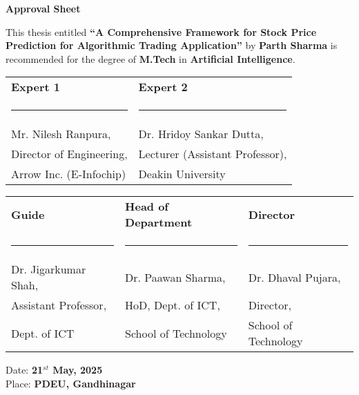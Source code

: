 \begin{center}
\textbf{\large Approval Sheet}
\end{center}

This thesis entitled \textbf{\enquote{A Comprehensive Framework for Stock Price Prediction for Algorithmic Trading Application}} by \textbf{Parth Sharma} is recommended for the degree of \textbf{M.Tech} in \textbf{Artificial Intelligence}.

\vspace{1cm}
\begin{table}[h!]
    \centering
    \begin{tabular}{@{}m{}<{\centering} m{}<{\centering}@{}}
    \textbf{Expert 1} & \textbf{Expert 2} \\[2.5em]
    \rule{0.35\textwidth}{0.4pt} & \rule{0.35\textwidth}{0.4pt} \\[0.5em]
    Mr. Nilesh Ranpura, & Dr. Hridoy Sankar Dutta, \\[0.5em]
    Director of Engineering, & Lecturer (Assistant Professor), \\[0.5em]
    Arrow Inc. (E-Infochip) & Deakin University \\[3em]
    \end{tabular}
\end{table}

\begin{table}[h!]
    \centering
    \begin{tabular}{@{}m{}<{\centering} m{}<{\centering} m{}<{\centering}@{}}
    \textbf{Guide} & \textbf{Head of Department} & \textbf{Director} \\[2.5em]
    \rule{0.25\textwidth}{0.4pt} & \rule{0.25\textwidth}{0.4pt} & \rule{0.25\textwidth}{0.4pt} \\[0.5em]
    Dr. Jigarkumar Shah, & Dr. Paawan Sharma, & Dr. Dhaval Pujara, \\[0.5em]
    Assistant Professor, & HoD, Dept. of ICT, & Director, \\[0.5em]
    Dept. of ICT & School of Technology & School of Technology \\
    \end{tabular}
\end{table}

\vfill
\begin{flushleft}
    Date: \textbf{21$^{st}$ May, 2025}\\
    Place: \textbf{PDEU, Gandhinagar}\\    
\end{flushleft}